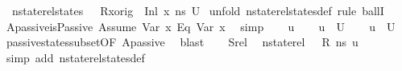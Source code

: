 \begin{isabellebody}
\ {\isacharparenleft}{\kern0pt}\ {\isachardoublequoteopen}nstate{\isacharunderscore}{\kern0pt}rel{\isacharunderscore}{\kern0pt}states\ {\isasymLambda}\ {\isasymLambda}{\isacharprime}{\kern0pt}\ {\isacharparenleft}{\kern0pt}R{\isacharparenleft}{\kern0pt}x{\isacharunderscore}{\kern0pt}orig\ {\isasymmapsto}\ {\isacharparenleft}{\kern0pt}Inl\ x{}{\isacharparenright}{\kern0pt}{\isacharparenright}{\kern0pt}{\isacharparenright}{\kern0pt}\ ns\ {\isacharquery}{\kern0pt}U{\isacharprime}{\kern0pt}{\isachardoublequoteclose}{\isacharparenright}{\kern0pt}\isanewline
%
\isadelimproof
%
\endisadelimproof
%
\isatagproof
{}\isamarkupfalse%
\ {\isacharparenleft}{\kern0pt}unfold\ nstate{\isacharunderscore}{\kern0pt}rel{\isacharunderscore}{\kern0pt}states{\isacharunderscore}{\kern0pt}def{\isacharcomma}{\kern0pt}\ rule\ ballI{\isacharparenright}{\kern0pt}\isanewline
\ \ \isamarkupfalse%
\ Apassive{\isacharcolon}{\kern0pt}{\isachardoublequoteopen}isPassive\ {\isacharparenleft}{\kern0pt}Assume\ {\isacharparenleft}{\kern0pt}{\isacharparenleft}{\kern0pt}Var\ x{}{\isacharparenright}{\kern0pt}\ {\isasymguillemotleft}Eq{\isasymguillemotright}\ {\isacharparenleft}{\kern0pt}Var\ x{}{\isacharparenright}{\kern0pt}{\isacharparenright}{\kern0pt}{\isacharparenright}{\kern0pt}{\isachardoublequoteclose}\ \isamarkupfalse%
\ simp\isanewline
\ \ \isamarkupfalse%
\ u{\isacharprime}{\kern0pt}\isanewline
\ \ \isamarkupfalse%
\ {\isachardoublequoteopen}u{\isacharprime}{\kern0pt}\ {\isasymin}\ {\isacharquery}{\kern0pt}U{\isacharprime}{\kern0pt}{\isachardoublequoteclose}\isanewline
\ \ \isamarkupfalse%
\ {\isachardoublequoteopen}u{\isacharprime}{\kern0pt}\ {\isasymin}\ U{\isachardoublequoteclose}\ \isamarkupfalse%
\ passive{\isacharunderscore}{\kern0pt}states{\isacharunderscore}{\kern0pt}subset{\isacharbrackleft}{\kern0pt}OF\ Apassive{\isacharbrackright}{\kern0pt}\ \isamarkupfalse%
\ blast\isanewline
\ \ \isamarkupfalse%
\ Srel\ \isamarkupfalse%
\ {\isachardoublequoteopen}nstate{\isacharunderscore}{\kern0pt}rel\ {\isasymLambda}\ {\isasymLambda}{\isacharprime}{\kern0pt}\ R\ ns\ u{\isacharprime}{\kern0pt}{\isachardoublequoteclose}\ \isamarkupfalse%
\ {\isacharparenleft}{\kern0pt}simp\ add{\isacharcolon}{\kern0pt}\ nstate{\isacharunderscore}{\kern0pt}rel{\isacharunderscore}{\kern0pt}states{\isacharunderscore}{\kern0pt}def{\isacharparenright}{\kern0pt}\isanewline

\end{isabellebody}

